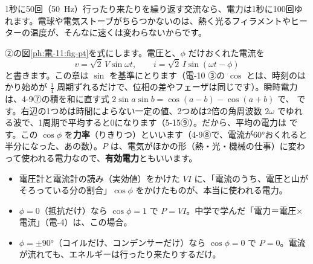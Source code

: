 1秒に50回（\qty{50}{Hz}）行ったり来たりを繰り返す交流なら、電力は1秒に100回ゆれます。電球や電気ストーブがちらつかないのは、熱く光るフィラメントやヒーターの温度が、そんなに速くは変わらないからです。


\label{ph:電-11:sec3}
②の図\ref{ph:電-11:fig-pt}を式にします。電圧と、$\phi$ だけおくれた電流を
\[v=\sqrt2\,V\sin\omega t,\qquad i=\sqrt2\,I\sin(\omega t-\phi)\]
と書きます。この章は $\sin$ を基準にとります（電-10 ③の $\cos$ とは、時刻のはかり始めが $\tfrac14$ 周期ずれるだけで、位相の差やフェーザは同じです）。瞬時電力は、4-9⑦の積を和に直す式 $2\sin a\sin b=\cos(a-b)-\cos(a+b)$ で、
です。右辺の1つめは時間によらない一定の値、2つめは2倍の角周波数 $2\omega$ でゆれる波で、1周期で平均すると0になります（5-15⑨）。だから、平均の電力は
です。\label{ph:電-11:rikiritsu}この $\cos\phi$ を\textbf{力率}（りきりつ）といいます（4-9⑧で、電流が60°おくれると半分になった、あの数）。$P$ は、電気がほかの形（熱・光・機械の仕事）に変わって使われる電力なので、\textbf{有効電力}ともいいます。

\begin{phyomi}[$P=VI\cos\phi$]
\begin{itemize}[leftmargin=1.2\zw, itemsep=1pt, topsep=1pt, label={\color{bkTheme}●}]
\item 電圧計と電流計の読み（実効値）をかけた $VI$ に、「電流のうち、電圧と山がそろっている分の割合」$\cos\phi$ をかけたものが、本当に使われる電力。
\item $\phi=0$（抵抗だけ）なら $\cos\phi=1$ で $P=VI$。中学で学んだ「電力＝電圧×電流」（電-4）は、この場合。
\item $\phi=\pm90°$（コイルだけ、コンデンサーだけ）なら $\cos\phi=0$ で $P=0$。電流が流れても、エネルギーは行ったり来たりするだけ。
\end{itemize}
\end{phyomi}

